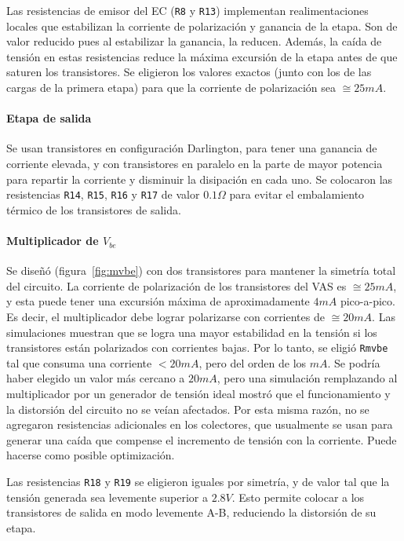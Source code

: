 \documentclass[a4paper,12pt,twoside]{article}
\begin{document}
Las resistencias de emisor del EC (\texttt{R8} y \texttt{R13}) implementan realimentaciones locales que estabilizan la corriente de polarización y ganancia de la etapa. Son de valor reducido pues al estabilizar la ganancia, la reducen. Además, la caída de tensión en estas resistencias reduce la máxima excursión de la etapa antes de que saturen los transistores. Se eligieron los valores exactos (junto con los de las cargas de la primera etapa) para que la corriente de polarización sea $\cong 25mA$.

\paragraph{Etapa de salida}

Se usan transistores en configuración Darlington, para tener una ganancia de corriente elevada, y con transistores en paralelo en la parte de mayor potencia para repartir la corriente y disminuir la disipación en cada uno. Se colocaron las resistencias \texttt{R14}, \texttt{R15}, \texttt{R16} y \texttt{R17} de valor $0.1\Omega$ para evitar el embalamiento térmico de los transistores de salida.




\paragraph{Multiplicador de $V_{be}$}


Se diseñó (figura~\ref{fig:mvbe}) con dos transistores para mantener la simetría total del circuito. La corriente de polarización de los transistores del VAS es $\cong 25mA$, y esta puede tener una excursión máxima de aproximadamente $4mA$ pico-a-pico. Es decir, el multiplicador debe lograr polarizarse con corrientes de $\cong 20mA$. Las simulaciones muestran que se logra una mayor estabilidad en la tensión si los transistores están polarizados con corrientes bajas. Por lo tanto, se eligió \texttt{Rmvbe} tal que consuma una corriente $<20mA$, pero del orden de los $mA$. Se podría haber elegido un valor más cercano a $20mA$, pero una simulación remplazando al multiplicador por un generador de tensión ideal mostró que el funcionamiento y la distorsión del circuito no se veían afectados. Por esta misma razón, no se agregaron resistencias adicionales en los colectores, que usualmente se usan para generar una caída que compense el incremento de tensión con la corriente. Puede hacerse como posible optimización.

Las resistencias \texttt{R18} y \texttt{R19} se eligieron iguales por simetría, y de valor tal que la tensión generada sea levemente superior a $2.8V$. Esto permite colocar a los transistores de salida en modo levemente A-B, reduciendo la distorsión de su etapa.
\end{document}
